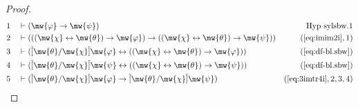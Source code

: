 \begin{proof}
\begin{align}
  1 &&  & \vdash ( \mw{\varphi} \rightarrow \mw{\psi} )&\text{Hyp~sylsbw.1}\notag%
  \\ 2 &&  & \vdash ( ( ( \mw{\chi} \leftrightarrow \mw{\theta} ) \rightarrow \mw{\varphi} ) \rightarrow ( ( \mw{\chi} \leftrightarrow \mw{\theta} ) \rightarrow \mw{\psi} ) )&(\mbox{\ref{eq:imim2i}},1)\notag
  \\ 3 &&  & \vdash ( \overline{[} \mw{\theta} / \mw{\chi} \overline{]} \mw{\varphi} \leftrightarrow ( ( \mw{\chi} \leftrightarrow \mw{\theta} ) \rightarrow \mw{\varphi} ) )&(\mbox{\ref{eq:df-bl.sbw}})\notag
  \\ 4 &&  & \vdash ( \overline{[} \mw{\theta} / \mw{\chi} \overline{]} \mw{\psi} \leftrightarrow ( ( \mw{\chi} \leftrightarrow \mw{\theta} ) \rightarrow \mw{\psi} ) )&(\mbox{\ref{eq:df-bl.sbw}})\notag
  \\ 5 &&  & \vdash ( \overline{[} \mw{\theta} / \mw{\chi} \overline{]} \mw{\varphi} \rightarrow \overline{[} \mw{\theta} / \mw{\chi} \overline{]} \mw{\psi} )&(\mbox{\ref{eq:3imtr4i}},2,3,4)\notag
\end{align}
\end{proof}

